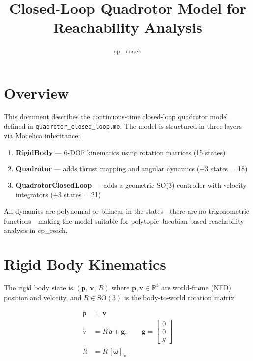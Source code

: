 \documentclass[11pt]{article}
\title{Closed-Loop Quadrotor Model for Reachability Analysis}
\author{cp\_reach}
\date{}
\newcommand{\R}{\mathbb{R}}
\newcommand{\SO}{\mathrm{SO}(3)}
\newcommand{\skew}[1]{[#1]_\times}
\newcommand{\der}[1]{\dot{#1}}
\begin{document}
\maketitle

\section{Overview}

This document describes the continuous-time closed-loop quadrotor model
defined in \texttt{quadrotor\_closed\_loop.mo}. The model is structured
in three layers via Modelica inheritance:

\begin{enumerate}
  \item \textbf{RigidBody} --- 6-DOF kinematics using rotation matrices
        (15 states)
  \item \textbf{Quadrotor} --- adds thrust mapping and angular dynamics
        (+3 states = 18)
  \item \textbf{QuadrotorClosedLoop} --- adds a geometric SO(3)
        controller with velocity integrators (+3 states = 21)
\end{enumerate}

All dynamics are polynomial or bilinear in the states---there are no
trigonometric functions---making the model suitable for polytopic
Jacobian-based reachability analysis in cp\_reach.

\section{Rigid Body Kinematics}

The rigid body state is $(\bm{p},\, \bm{v},\, R)$ where
$\bm{p}, \bm{v} \in \R^3$ are world-frame (NED) position and velocity,
and $R \in \SO$ is the body-to-world rotation matrix.

\begin{align}
  \der{\bm{p}} &= \bm{v} \\[4pt]
  \der{\bm{v}} &= R\,\bm{a} + \bm{g}, \qquad
    \bm{g} = \begin{bmatrix} 0 \\ 0 \\ g \end{bmatrix} \\[4pt]
  \der{R} &= R\,\skew{\bm{\omega}}
\end{align}
\end{document}
